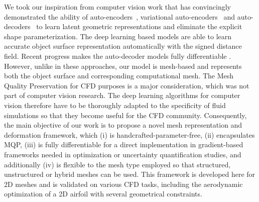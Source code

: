 We took our inspiration from computer vision work that has convincingly demonstrated the ability of auto-encoders~\cite{ai.Dai2017,ai.Wu2018b}, variational auto-encoders~\cite{ai.Bagautdinov2018} and auto-decoders~\cite{ai.Tan1995,ai.Park2019c} to learn latent geometric representations and eliminate the explicit shape parameterization. The deep learning based models are able to learn accurate object surface representation automatically with the signed distance field. Recent progress makes the auto-decoder models fully differentiable \cite{ai.Remelli2020b}.
However, unlike in these approaches, our model is mesh-based and represents both the object surface and corresponding computational mesh. The Mesh Quality Preservation for CFD purposes is a major consideration, which was not part of computer vision research.
The deep learning algorithms for computer vision therefore have to be thoroughly adapted to the specificity of fluid simulations so that they become useful for the CFD community. Consequently, the main objective of our work is to propose a novel mesh representation and deformation framework, which (i) is handcrafted-parameter-free, (ii) encapsulates MQP, (iii) is fully differentiable for a direct implementation in gradient-based frameworks needed in optimization or uncertainty quantification studies, and additionally (iv) is flexible to the mesh type employed so that structured, unstructured or hybrid meshes can be used. This framework is developed here for 2D meshes and is validated on various CFD tasks, including the aerodynamic optimization of a 2D airfoil with several geometrical constraints.